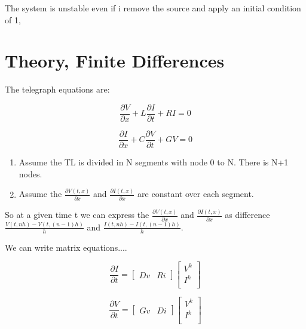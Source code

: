\documentclass[12pt, letterpaper]{article}
\begin{document}
\begin{mdframed}
	The system is unstable even if i remove the source and apply an initial condition of 1,
\end{mdframed}

\section{Theory, Finite Differences}

The telegraph equations are:

\begin{equation}\frac{\partial{V}}{\partial{x}} + L \frac{\partial{I}}{\partial{t}} + R I = 0\end{equation}


\begin{equation}\frac{\partial{I}}{\partial{x}} + C \frac{\partial{V}}{\partial{t}} + G V = 0\end{equation}


\begin{enumerate}
\item Assume the TL is divided in N segments with node 0 to N. There is N+1 nodes.
\item Assume the $\frac{\partial V(t, x)}{\partial x}$ and $\frac{\partial I(t, x)}{\partial x}$ are constant over each segment.
\end{enumerate}

So at a given time t we can express the $\frac{\partial V(t, x)}{\partial x}$ and $\frac{\partial I(t, x)}{\partial x}$ as difference  $\frac{V(t, n h) - V(t, (n-1) h)}{h}$ and  $\frac{I(t, n h) - I(t, (n-1) h)}{h}$.

We can write matrix equations....

\begin{equation}
\frac{\partial{I}}{\partial{t}} 
=
	\begin{bmatrix}
		Dv & Ri
	\end{bmatrix}
	\begin{bmatrix}
		V^k \\
		I^k \\
	\end{bmatrix}
\end{equation}

\begin{equation}
	\frac{\partial{V}}{\partial{t}} 
	=
	\begin{bmatrix}
		Gv & Di
	\end{bmatrix}
	\begin{bmatrix}
		V^k \\
		I^k \\
	\end{bmatrix}
\end{equation}
\end{document}
